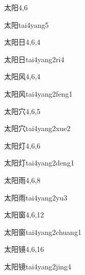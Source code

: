 \begin{entry}{太阳}{4,6}
  \begin{phonetics}{太阳}{tai4yang5}
  \end{phonetics}
\end{entry}

\begin{entry}{太阳日}{4,6,4}
  \begin{phonetics}{太阳日}{tai4yang2ri4}
  \end{phonetics}
\end{entry}

\begin{entry}{太阳风}{4,6,4}
  \begin{phonetics}{太阳风}{tai4yang2feng1}
  \end{phonetics}
\end{entry}

\begin{entry}{太阳穴}{4,6,5}
  \begin{phonetics}{太阳穴}{tai4yang2xue2}
  \end{phonetics}
\end{entry}

\begin{entry}{太阳灯}{4,6,6}
  \begin{phonetics}{太阳灯}{tai4yang2deng1}
  \end{phonetics}
\end{entry}

\begin{entry}{太阳雨}{4,6,8}
  \begin{phonetics}{太阳雨}{tai4yang2yu3}
  \end{phonetics}
\end{entry}

\begin{entry}{太阳窗}{4,6,12}
  \begin{phonetics}{太阳窗}{tai4yang2chuang1}
  \end{phonetics}
\end{entry}

\begin{entry}{太阳镜}{4,6,16}
  \begin{phonetics}{太阳镜}{tai4yang2jing4}
  \end{phonetics}
\end{entry}

